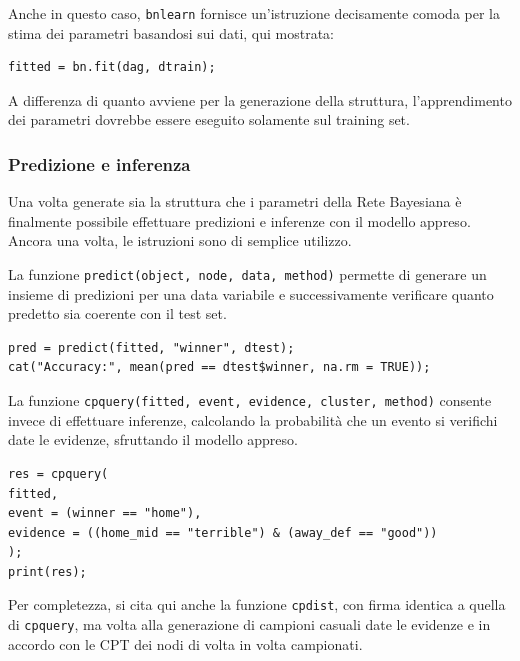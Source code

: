 \documentclass[hidelinks, 12pt]{article}
\begin{document}
Anche in questo caso, \texttt{bnlearn} fornisce un'istruzione decisamente comoda per la stima dei parametri basandosi sui dati, qui mostrata:

\begin{verbatim}
fitted = bn.fit(dag, dtrain);
\end{verbatim}

A differenza di quanto avviene per la generazione della struttura, l'apprendimento dei parametri dovrebbe essere eseguito solamente sul training set.


\subsubsection{Predizione e inferenza}

Una volta generate sia la struttura che i parametri della Rete Bayesiana è finalmente possibile effettuare predizioni e inferenze con il modello appreso. Ancora una volta, le istruzioni sono di semplice utilizzo. 

\vspace{2ex}

La funzione \texttt{predict(object, node, data, method)} permette di generare un insieme di predizioni per una data variabile e successivamente verificare quanto predetto sia coerente con il test set.

\begin{verbatim}
pred = predict(fitted, "winner", dtest);
cat("Accuracy:", mean(pred == dtest$winner, na.rm = TRUE));
\end{verbatim}

\vspace{2ex}

La funzione \texttt{cpquery(fitted, event, evidence, cluster, method)} consente invece di effettuare inferenze, calcolando la probabilità che un evento si verifichi date le evidenze, sfruttando il modello appreso.

\begin{verbatim}
res = cpquery(
fitted,
event = (winner == "home"),
evidence = ((home_mid == "terrible") & (away_def == "good"))
);
print(res);
\end{verbatim}

\vspace{2ex}

Per completezza, si cita qui anche la funzione \texttt{cpdist}, con firma identica a quella di \texttt{cpquery}, ma volta alla generazione di campioni casuali date le evidenze e in accordo con le CPT dei nodi di volta in volta campionati.
\end{document}
